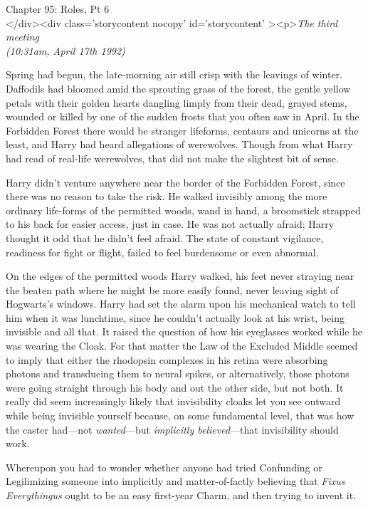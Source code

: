 
Chapter 95: Roles, Pt 6\\
</div><div  class='storycontent nocopy' id='storycontent' ><p>\emph{The third 
meeting\\
(10:31am, April 17th 1992)}

Spring had begun, the late-morning air still crisp with the leavings of winter. 
Daffodils had bloomed amid the sprouting grass of the forest, the gentle yellow 
petals with their golden hearts dangling limply from their dead, grayed stems, 
wounded or killed by one of the sudden frosts that you often saw in April. In 
the Forbidden Forest there would be stranger lifeforms, centaurs and unicorns 
at the least, and Harry had heard allegations of werewolves. Though from what 
Harry had read of real-life werewolves, that did not make the slightest bit of 
sense.

Harry didn't venture anywhere near the border of the Forbidden Forest, since 
there was no reason to take the risk. He walked invisibly among the more 
ordinary life-forms of the permitted woods, wand in hand, a broomstick strapped 
to his back for easier access, just in case. He was not actually afraid; Harry 
thought it odd that he didn't feel afraid. The state of constant vigilance, 
readiness for fight or flight, failed to feel burdensome or even abnormal.

On the edges of the permitted woods Harry walked, his feet never straying near 
the beaten path where he might be more easily found, never leaving sight of 
Hogwarts's windows. Harry had set the alarm upon his mechanical watch to tell 
him when it was lunchtime, since he couldn't actually look at his wrist, being 
invisible and all that. It raised the question of how his eyeglasses worked 
while he was wearing the Cloak. For that matter the Law of the Excluded Middle 
seemed to imply that either the rhodopsin complexes in his retina were 
absorbing photons and transducing them to neural spikes, or alternatively, 
those photons were going straight through his body and out the other side, but 
not both. It really did seem increasingly likely that invisibility cloaks let 
you see outward while being invisible yourself because, on some fundamental 
level, that was how the caster had---not \emph{wanted}---but \emph{implicitly 
believed}---that invisibility should work.

Whereupon you had to wonder whether anyone had tried Confunding or Legilimizing 
someone into implicitly and matter-of-factly believing that \emph{Fixus 
Everythingus} ought to be an easy first-year Charm, and then trying to invent 
it.

